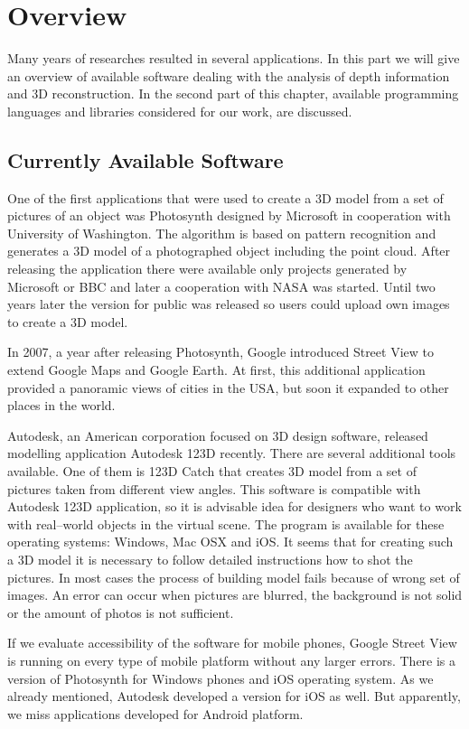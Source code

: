 \chapter{Overview}
Many years of researches resulted in several applications.
In this part we will give an overview of available software dealing with the analysis of depth information and 3D reconstruction. 
In the second part of this chapter, available programming languages and libraries considered for our work, are discussed.

\section{Currently Available Software}
One of the first applications that were used to create a 3D model from a set of pictures of an object was Photosynth designed by Microsoft in cooperation with University of Washington. 
The algorithm is based on pattern recognition and generates a 3D model of a photographed object including the point cloud. 
After releasing the application there were available only projects generated by Microsoft or BBC and later a cooperation with NASA was started. 
Until two years later the version for public was released so users could upload own images to create a 3D model.

In 2007, a year after releasing Photosynth, Google introduced Street View to extend Google Maps and Google Earth. 
At first, this additional application provided a panoramic views of cities in the USA, but soon it expanded to other places in the world.

Autodesk, an American corporation focused on 3D design software, released modelling application Autodesk 123D recently. 
There are several additional tools available. 
One of them is 123D Catch that creates 3D model from a set of pictures taken from different view angles. 
This software is compatible with Autodesk 123D application, so it is advisable idea for designers who want to work with real–world objects in the virtual scene.
The program is available for these operating systems: Windows, Mac OSX and iOS\@. 
It seems that for creating such a 3D model it is necessary to follow detailed instructions how to shot the pictures. 
In most cases the process of building model fails because of wrong set of images. 
An error can occur when pictures are blurred, the background is not solid or the amount of photos is not sufficient.

If we evaluate accessibility of the software for mobile phones, Google Street View is running on every type of mobile platform without any larger errors. 
There is a version of Photosynth for Windows phones and iOS operating system. 
As we already mentioned, Autodesk developed a version for iOS as well. 
But apparently, we miss applications developed for Android platform.


